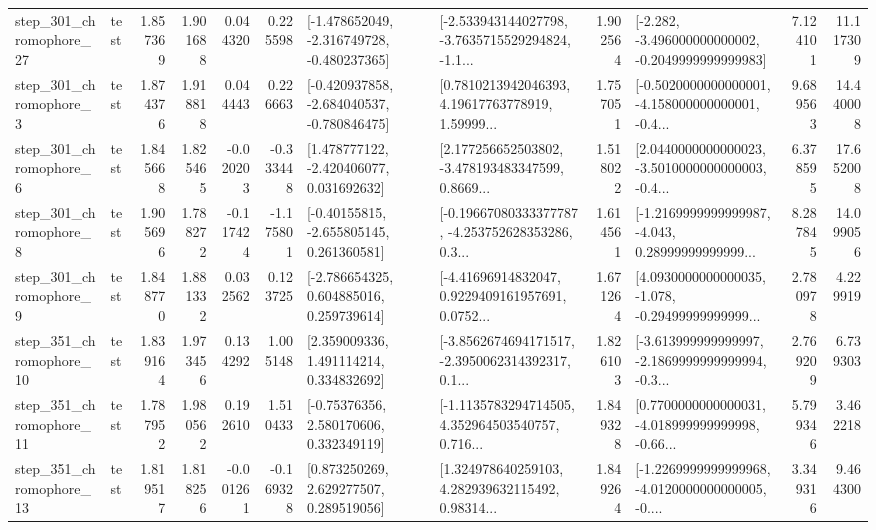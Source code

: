 \begin{tabular}{llrrrrllrlrr}
  step\_301\_chromophore\_27 &      test &      1.857369 &    1.901688 &      0.044320 &  0.225598 &  [-1.478652049, -2.316749728, -0.480237365] &  [-2.533943144027798, -3.7635715529294824, -1.1... &       1.902564 &  [-2.282, -3.496000000000002, -0.2049999999999983] &            7.124101 &         11.117309 \\
   step\_301\_chromophore\_3 &      test &      1.874376 &    1.918818 &      0.044443 &  0.226663 &  [-0.420937858, -2.684040537, -0.780846475] &  [0.7810213942046393, 4.19617763778919, 1.59999... &       1.757051 &  [-0.5020000000000001, -4.158000000000001, -0.4... &            9.689563 &         14.440008 \\
   step\_301\_chromophore\_6 &      test &      1.845668 &    1.825465 &     -0.020203 & -0.333448 &    [1.478777122, -2.420406077, 0.031692632] &  [2.177256652503802, -3.478193483347599, 0.8669... &       1.518022 &  [2.0440000000000023, -3.5010000000000003, -0.4... &            6.378595 &         17.652008 \\
   step\_301\_chromophore\_8 &      test &      1.905696 &    1.788272 &     -0.117424 & -1.175801 &    [-0.40155815, -2.655805145, 0.261360581] &  [-0.19667080333377787, -4.253752628353286, 0.3... &       1.614561 &  [-1.2169999999999987, -4.043, 0.28999999999999... &            8.287845 &         14.099056 \\
   step\_301\_chromophore\_9 &      test &      1.848770 &    1.881332 &      0.032562 &  0.123725 &    [-2.786654325, 0.604885016, 0.259739614] &  [-4.41696914832047, 0.9229409161957691, 0.0752... &       1.671264 &  [4.0930000000000035, -1.078, -0.29499999999999... &            2.780978 &          4.229919 \\
  step\_351\_chromophore\_10 &      test &      1.839164 &    1.973456 &      0.134292 &  1.005148 &     [2.359009336, 1.491114214, 0.334832692] &  [-3.8562674694171517, -2.3950062314392317, 0.1... &       1.826103 &  [-3.613999999999997, -2.1869999999999994, -0.3... &            2.769209 &          6.739303 \\
  step\_351\_chromophore\_11 &      test &      1.787952 &    1.980562 &      0.192610 &  1.510433 &     [-0.75376356, 2.580170606, 0.332349119] &  [-1.1135783294714505, 4.352964503540757, 0.716... &       1.849328 &  [0.7700000000000031, -4.018999999999998, -0.66... &            5.799346 &          3.462218 \\
  step\_351\_chromophore\_13 &      test &      1.819517 &    1.818256 &     -0.001261 & -0.169328 &     [0.873250269, 2.629277507, 0.289519056] &  [1.324978640259103, 4.282939632115492, 0.98314... &       1.849264 &  [-1.2269999999999968, -4.0120000000000005, -0.... &            3.349316 &          9.464300 \\

\end{tabular}
